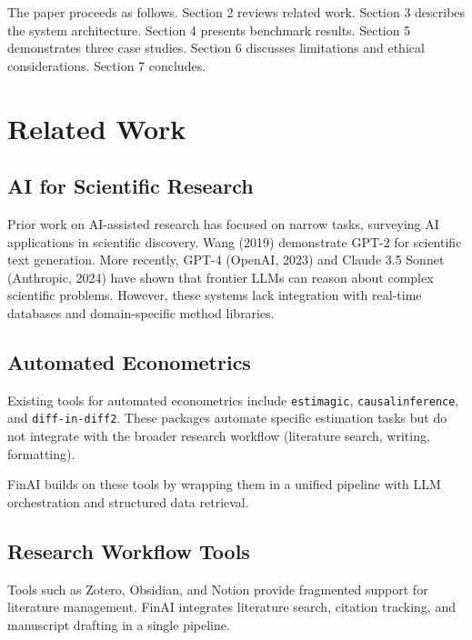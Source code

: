 \documentclass[12pt, a4paper]{article}
\begin{document}
The paper proceeds as follows. Section 2 reviews related work. Section 3 describes the system architecture. Section 4 presents benchmark results. Section 5 demonstrates three case studies. Section 6 discusses limitations and ethical considerations. Section 7 concludes.

\section{Related Work}

\subsection{AI for Scientific Research}

Prior work on AI-assisted research has focused on narrow tasks, surveying AI applications in scientific discovery.  Wang (2019) demonstrate GPT-2 for scientific text generation.  More recently, GPT-4 (OpenAI, 2023) and Claude 3.5 Sonnet (Anthropic, 2024) have shown that frontier LLMs can reason about complex scientific problems.  However, these systems lack integration with real-time databases and domain-specific method libraries.

\subsection{Automated Econometrics}

Existing tools for automated econometrics include \texttt{estimagic}, \texttt{causalinference}, and \texttt{diff-in-diff2}.  These packages automate specific estimation tasks but do not integrate with the broader research workflow (literature search, writing, formatting).

FinAI builds on these tools by wrapping them in a unified pipeline with LLM orchestration and structured data retrieval.

\subsection{Research Workflow Tools}

Tools such as Zotero, Obsidian, and Notion provide fragmented support for literature management.  FinAI integrates literature search, citation tracking, and manuscript drafting in a single pipeline.
\end{document}
